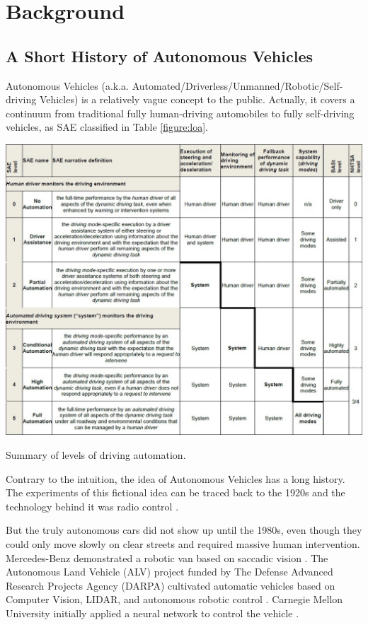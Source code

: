 \documentclass[a4paper,12pt]{article}
\begin{document}
\section{Background}
\label{background}
\subsection{A Short History of Autonomous Vehicles}
\label{avh}

Autonomous Vehicles (a.k.a. Automated/Driverless/Unmanned/Robotic/Self-driving Vehicles) is a relatively vague concept to the public. Actually, it covers a continuum  from traditional fully human-driving automobiles to fully self-driving vehicles, as SAE classified in Table \ref{figure:loa}.

\begin{table}[h]		
	\includegraphics[width=1\textwidth]{Levels_of_Automation_2014.jpg}
	\caption{Summary of levels of driving automation\cite{J3016_201401}.}
	\centering
	\label{figure:loa}
\end{table}

Contrary to the intuition, the idea of Autonomous Vehicles has a long history. The experiments of this fictional idea can be traced back to the 1920s and the technology behind it was radio control \cite{pawtc}. 

But the truly autonomous cars did not show up until the 1980s, even though they could only move slowly on clear streets and required massive human intervention. Mercedes-Benz demonstrated a robotic van based on saccadic vision \cite{schj}. The Autonomous Land Vehicle (ALV) project funded by The Defense Advanced Research Projects Agency (DARPA) cultivated automatic vehicles based on Computer Vision, LIDAR, and autonomous robotic control \cite{Kanade:1986:ALV:324634.325197}. Carnegie Mellon University initially applied a neural network to control the vehicle \cite{NIPS1988_95}. 
\end{document}
